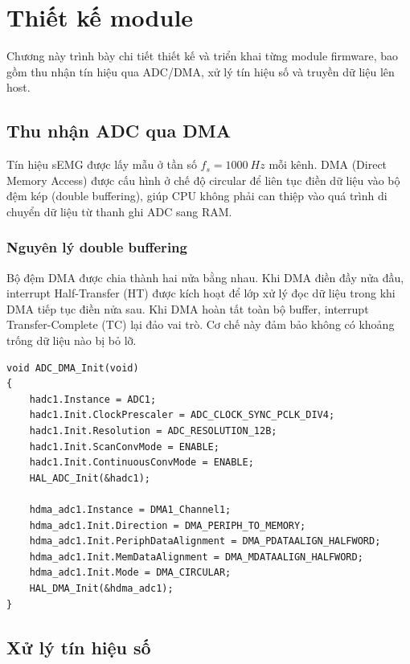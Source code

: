 \chapter{Thiết kế module}
\label{ch:modules}

Chương này trình bày chi tiết thiết kế và triển khai từng module firmware, bao gồm thu nhận tín hiệu qua ADC/DMA, xử lý tín hiệu số và truyền dữ liệu lên host.

\section{Thu nhận ADC qua DMA}

Tín hiệu sEMG được lấy mẫu ở tần số $f_s = \SI{1000}{Hz}$ mỗi kênh. DMA (Direct Memory Access) được cấu hình ở chế độ circular để liên tục điền dữ liệu vào bộ đệm kép (double buffering), giúp CPU không phải can thiệp vào quá trình di chuyển dữ liệu từ thanh ghi ADC sang RAM.

\subsection{Nguyên lý double buffering}
Bộ đệm DMA được chia thành hai nửa bằng nhau. Khi DMA điền đầy nửa đầu, interrupt Half-Transfer (HT) được kích hoạt để lớp xử lý đọc dữ liệu trong khi DMA tiếp tục điền nửa sau. Khi DMA hoàn tất toàn bộ buffer, interrupt Transfer-Complete (TC) lại đảo vai trò. Cơ chế này đảm bảo không có khoảng trống dữ liệu nào bị bỏ lỡ.

\begin{lstlisting}[caption={Cấu hình DMA cho ADC đa kênh.}, label={lst:adc_dma}]
void ADC_DMA_Init(void)
{
    hadc1.Instance = ADC1;
    hadc1.Init.ClockPrescaler = ADC_CLOCK_SYNC_PCLK_DIV4;
    hadc1.Init.Resolution = ADC_RESOLUTION_12B;
    hadc1.Init.ScanConvMode = ENABLE;
    hadc1.Init.ContinuousConvMode = ENABLE;
    HAL_ADC_Init(&hadc1);

    hdma_adc1.Instance = DMA1_Channel1;
    hdma_adc1.Init.Direction = DMA_PERIPH_TO_MEMORY;
    hdma_adc1.Init.PeriphDataAlignment = DMA_PDATAALIGN_HALFWORD;
    hdma_adc1.Init.MemDataAlignment = DMA_MDATAALIGN_HALFWORD;
    hdma_adc1.Init.Mode = DMA_CIRCULAR;
    HAL_DMA_Init(&hdma_adc1);
}
\end{lstlisting}

\section{Xử lý tín hiệu số}

